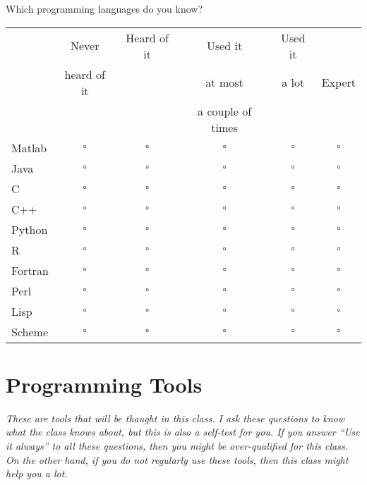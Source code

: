 \documentclass[article,twoside]{memoir}
\newcommand*{\checkbox}{$\square$}
\newcommand{\header}[1]{\textsl{#1}\par\medskip}
\def\th#1{#1}
\begin{document}
Which programming languages do you know?

\begin{tabular}{lccccc}
 \toprule
 & \th{Never}       & \th{Heard of it} & \th{Used it}           & \th{Used it} & \th{}\\
 & \th{heard of it} & \th{}            & \th{at most}           & \th{a lot}   & \th{Expert}\\
 & \th{}            & \th{}            & \th{a couple of times} & \th{}        & \th{}\\
 \midrule
Matlab  &\checkbox &\checkbox &\checkbox &\checkbox &\checkbox \\
Java    &\checkbox &\checkbox &\checkbox &\checkbox &\checkbox \\
C       &\checkbox &\checkbox &\checkbox &\checkbox &\checkbox \\
C++     &\checkbox &\checkbox &\checkbox &\checkbox &\checkbox \\
Python  &\checkbox &\checkbox &\checkbox &\checkbox &\checkbox \\
R       &\checkbox &\checkbox &\checkbox &\checkbox &\checkbox \\
Fortran &\checkbox &\checkbox &\checkbox &\checkbox &\checkbox \\
Perl    &\checkbox &\checkbox &\checkbox &\checkbox &\checkbox \\
Lisp    &\checkbox &\checkbox &\checkbox &\checkbox &\checkbox \\
Scheme  &\checkbox &\checkbox &\checkbox &\checkbox &\checkbox \\
\end{tabular}

\section{Programming Tools}
\header{These are tools that will be thaught in this class. I ask these questions to know what the class knows about, but this is also a self-test for you. If you answer ``Use it always'' to all these questions, then you might be over-qualified for this class.  On the other hand, if you do not regularly use these tools, then this class might help you a lot.}
\end{document}
